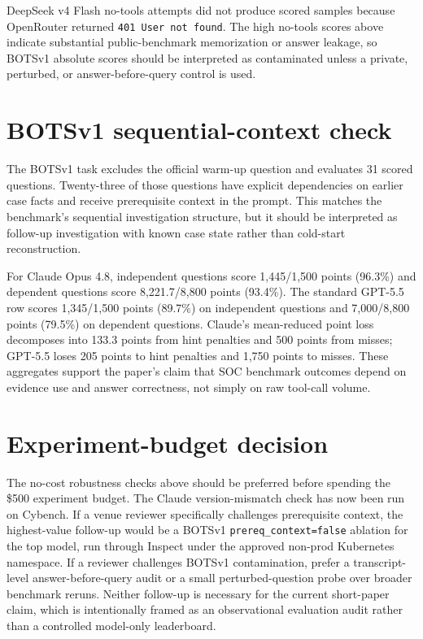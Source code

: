 \documentclass{article}
\begin{document}
DeepSeek v4 Flash no-tools attempts did not produce scored samples because OpenRouter returned \texttt{401 User not found}.  The high no-tools scores above indicate substantial public-benchmark memorization or answer leakage, so BOTSv1 absolute scores should be interpreted as contaminated unless a private, perturbed, or answer-before-query control is used.

\section{BOTSv1 sequential-context check}

The BOTSv1 task excludes the official warm-up question and evaluates 31 scored questions.  Twenty-three of those questions have explicit dependencies on earlier case facts and receive prerequisite context in the prompt.  This matches the benchmark's sequential investigation structure, but it should be interpreted as follow-up investigation with known case state rather than cold-start reconstruction.

For Claude Opus 4.8, independent questions score 1,445/1,500 points (96.3\%) and dependent questions score 8,221.7/8,800 points (93.4\%).  The standard GPT-5.5 row scores 1,345/1,500 points (89.7\%) on independent questions and 7,000/8,800 points (79.5\%) on dependent questions.  Claude's mean-reduced point loss decomposes into 133.3 points from hint penalties and 500 points from misses; GPT-5.5 loses 205 points to hint penalties and 1,750 points to misses.  These aggregates support the paper's claim that SOC benchmark outcomes depend on evidence use and answer correctness, not simply on raw tool-call volume.

\section{Experiment-budget decision}

The no-cost robustness checks above should be preferred before spending the \$500 experiment budget.  The Claude version-mismatch check has now been run on Cybench.  If a venue reviewer specifically challenges prerequisite context, the highest-value follow-up would be a BOTSv1 \texttt{prereq\_context=false} ablation for the top model, run through Inspect under the approved non-prod Kubernetes namespace.  If a reviewer challenges BOTSv1 contamination, prefer a transcript-level answer-before-query audit or a small perturbed-question probe over broader benchmark reruns.  Neither follow-up is necessary for the current short-paper claim, which is intentionally framed as an observational evaluation audit rather than a controlled model-only leaderboard.
\end{document}
